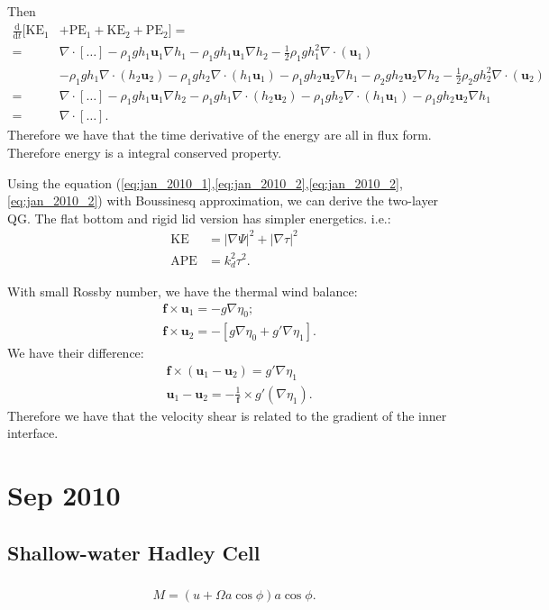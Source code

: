 \documentclass[11pt,letterpaper]{book}
\theoremstyle{definition}
\newcommand{\de}{\mathrm{d}}
\newcommand{\ve}[1]{\boldsymbol{#1}}
\newcommand{\APE}{\text{APE}}
\newcommand{\KE}{\text{KE}}
\begin{document}
Then
\begin{align*}
\frac{\de}{\de t}[\text{KE}_1&+\text{PE}_1+\text{KE}_2+\text{PE}_2] = \\
=& \nabla\cdot[\dots]-\rho_1gh_1\ve u_1\nabla h_1-\rho_1gh_1\ve u_1\nabla h_2-\frac{1}{2}\rho_1 g h_1^2\nabla\cdot(\ve u_1)\\
&-\rho_1 gh_1\nabla\cdot(h_2\ve u_2)-\rho_1 gh_2\nabla\cdot(h_1\ve u_1)-\rho_1gh_2\ve u_2\nabla h_1-\rho_2gh_2\ve u_2\nabla h_2-\frac{1}{2}\rho_2 g h_2^2\nabla\cdot(\ve u_2)\\
=& \nabla\cdot[\dots]-\rho_1gh_1\ve u_1\nabla h_2-\rho_1 gh_1\nabla\cdot(h_2\ve u_2)-\rho_1 gh_2\nabla\cdot(h_1\ve u_1)-\rho_1gh_2\ve u_2\nabla h_1\\
=& \nabla\cdot[\dots].
\end{align*}
Therefore we have that the time derivative of the energy are all in flux form. Therefore energy is a integral conserved property.

Using the equation (\ref{eq:jan_2010_1},\ref{eq:jan_2010_2},\ref{eq:jan_2010_2},\ref{eq:jan_2010_2}) with Boussinesq approximation, we can derive the two-layer QG. The flat bottom and rigid lid version has simpler energetics. i.e.:
\begin{align*}
\KE &= |\nabla \Psi|^2+|\nabla \tau|^2\\
\APE &= k_d^2\tau^2.
\end{align*}

With small Rossby number, we have the thermal wind balance:
\begin{align*}
&\ve f\times \ve u_1 = -g\nabla \eta_0 ;\\
&\ve f\times \ve u_2 = -[ g \nabla \eta_0+g' \nabla \eta_1] .
\end{align*}
We have their difference:
\begin{align*}
&\ve f\times (\ve u_1-\ve u_2) = g' \nabla \eta_1\\
&\ve u_1-\ve u_2 = -\frac{1}{\ve f}\times g'(\nabla\eta_1).
\end{align*}
Therefore we have that the velocity shear is related to the gradient of the inner interface.


\chapter{Sep 2010}
\section{Shallow-water Hadley Cell}
\subsection{}
\begin{align*}
M = (u+\Omega a\cos\phi)a\cos\phi.
\end{align*}
\end{document}
